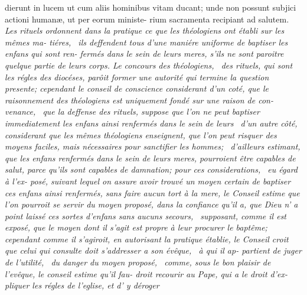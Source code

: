 \documentclass[twoside]{article}
\begin{document}
\newpage
\bgroup\fontsize{9.6}{13}\selectfont\noindent
dierunt in lucem ut cum aliis hominibus\break
vitam ducant; unde non possunt subjici\break
actioni humanæ, ut per eorum ministe-\break
rium sacramenta recipiant ad salutem.\break
\fontsize{9.6}{13}\selectfont\itshape Les rituels ordonnent dans la
pratique ce que\break
les théologiens ont établi sur les mêmes ma-\break
tiéres, \et\ ils deffendent tous d’une maniére\break
uniforme de baptiser les enfans qui sont ren-\break
fermés dans le sein de leurs meres, s’ils ne\break
sont paroitre quelque partie de leurs corps.\break 
Le concours des théologiens, \et\ des rituels,\break
qui sont les régles des diocéses, parôit former\break
une autorité qui termine la question presente\textnormal{;}\break
cependant le conseil de conscience considerant\break
d’un coté, que le raisonnement des théologiens\break
est uniquement fondé sur une raison de con-\break
venance, \et\ que la deffense des rituels, suppose\break
que l’on ne peut baptiser immediatement les\break
enfans ainsi renfermés dans le sein de leurs\break
{}\break
\et\ d’un autre côté, considerant que les mêmes
théologiens enseignent, que l’on peut risquer\break
{}\break
des moyens faciles, mais nécessaires pour\break 
sanctifier les hommes; \et\ d’ailleurs estimant,\break
que les enfans renfermés dans le sein de leurs\break
meres, pourroient être capables de salut,\break
parce qu’ils sont capables de damnation\textnormal{;}\tsk\break 
pour ces considerations, \et\ eu égard à l’ex-\break
posé, suivant lequel on assure avoir trouvé\break
un moyen certain de baptiser ces enfans ainsi\break
renfermés, sans faire aucun tort à la mere,\break
le Conseil estime que l’on pourroit se servir du\break
moyen proposé, dans la confiance qu’il a, que\break
Dieu n’ a point laissé ces sortes d’enfans\break
sans aucuns secours, \et\ supposant, comme\break
il est exposé, que le moyen dont il s’agit est\break
propre à leur procurer le baptême\textnormal{;} cependant\break
comme il s’agiroit, en autorisant la pratique\break
{}\break
établie, le Conseil croit que celui qui consulte\break
doit s’addresser a son évêque, \et\ à qui il ap-
partient de juger de l’utilité, \et\ du danger\break
du moyen proposé, \et\ comme, sous le bon\break
plaisir de l’evêque, le conseil estime qu’il fau-\break
droit recourir au Pape, qui a le droit d’ex-\break
pliquer les régles de l’eglise, et d’ y déroger\break
\end{document}
